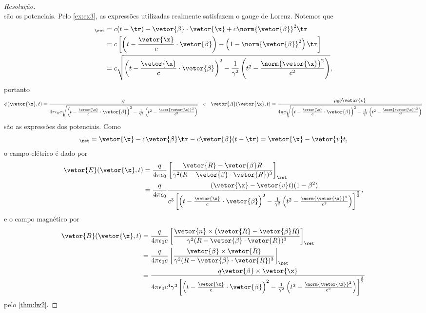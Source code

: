 \begin{proof}[Resolução]
\begin{equation*}
   \end{equation*}
   são os potenciais. Pelo \cref{ex:ex3}, as expressões utilizadas realmente satisfazem o gauge de Lorenz. Notemos que
   \begin{align*}
      [R - \vetor{\beta} \cdot \vetor{R}]_\ret &= c(t - \tr) - \vetor{\beta} \cdot \vetor{\x} + c \norm{\vetor{\beta}}^2 \tr\\
                                               &= c \left[\left(t - \frac{\vetor{\x}}{c} \cdot \vetor{\beta}\right) - \left(1 - \norm{\vetor{\beta}}^2\right)\tr\right]\\
                                               &= c \sqrt{\left(t - \frac{\vetor{\x}}{c} \cdot \vetor{\beta}\right)^2 - \frac{1}{\gamma^2}\left(t^2 - \frac{\norm{\vetor{\x}}^2}{c^2}\right)},
   \end{align*}
   portanto
   \begin{equation*}
      \phi(\vetor{\x}, t) = \frac{q}{4\pi \epsilon_0 c \sqrt{\left(t - \frac{\vetor{\x}}{c} \cdot \vetor{\beta}\right)^2 - \frac{1}{\gamma^2}\left(t^2 - \frac{\norm{\vetor{\x}}^2}{c^2}\right)}}
      \quad\text{e}\quad
      \vetor{A}(\vetor{\x},t) = \frac{\mu_0 q \vetor{v}}{4\pi c \sqrt{\left(t - \frac{\vetor{\x}}{c} \cdot \vetor{\beta}\right)^2 - \frac{1}{\gamma^2}\left(t^2 - \frac{\norm{\vetor{\x}}^2}{c^2}\right)}}
   \end{equation*}
   são as expressões dos potenciais. Como
   \begin{equation*}
      [\vetor{R} - R \vetor{\beta}]_\ret = \vetor{\x} - c\vetor{\beta} \tr - c\vetor{\beta}(t - \tr) =  \vetor{\x} - \vetor{v} t,
   \end{equation*}
   o campo elétrico é dado por
   \begin{align*}
      \vetor{E}(\vetor{\x}, t) &= \frac{q}{4\pi \epsilon_0} \left[\frac{\vetor{R} - \vetor{\beta} R}{\gamma^2 (R - \vetor{\beta} \cdot \vetor{R})^3}\right]_\ret\\
                               &= \frac{q}{4\pi \epsilon_0} 
                               \frac{(\vetor{\x} - \vetor{v} t)(1 - \beta^2)}{c^3 \left[\left(t - \frac{\vetor{\x}}{c} \cdot \vetor{\beta}\right)^2 - \frac{1}{\gamma^2}\left(t^2 - \frac{\norm{\vetor{\x}}^2}{c^2}\right)\right]^{\frac32}},
   \end{align*}
   e o campo magnético por
   \begin{align*}
      \vetor{B}(\vetor{\x}, t) &= \frac{q}{4\pi\epsilon_0c} \left[\frac{\vetor{n} \times (\vetor{R} - \vetor{\beta} R)}{\gamma^2 (R - \vetor{\beta} \cdot \vetor{R})^3}\right]_\ret\\
                               &= \frac{q}{4\pi \epsilon_0 c} \left[\frac{\vetor{\beta} \times \vetor{R}}{\gamma^2 (R - \vetor{\beta}\cdot \vetor{R})^3}\right]_\ret\\
                               &= \frac{q \vetor{\beta} \times \vetor{\x}}{4\pi \epsilon_0 c^4 \gamma^2 \left[\left(t - \frac{\vetor{\x}}{c} \cdot \vetor{\beta}\right)^2 - \frac{1}{\gamma^2} \left(t^2 - \frac{\norm{\vetor{\x}}^2}{c^2}\right)\right]^{\frac32}} 
   \end{align*}
   pelo \cref{thm:lw2}.


\end{proof}
